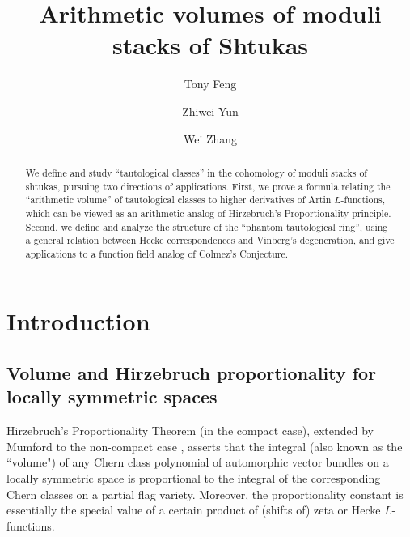 \documentclass[reqno]{amsart}
\title[Arithmetic volumes of moduli stacks of Shtukas]{Arithmetic volumes of moduli stacks of Shtukas}
\author{Tony Feng}
\author{Zhiwei Yun}
\author{Wei Zhang}
\date{}
\numberwithin{equation}{subsection}
\theoremstyle{definition}
\begin{document}
\begin{abstract}
    We define and study ``tautological classes'' in the cohomology of moduli stacks of shtukas, pursuing two directions of applications. First, we prove a formula relating the ``arithmetic volume'' of tautological classes to higher derivatives of Artin $L$-functions, which can be viewed as an arithmetic analog of Hirzebruch's Proportionality principle. Second, we define and analyze the structure of the ``phantom tautological ring'',  using a general relation between Hecke correspondences and Vinberg's degeneration, and give applications to a function field analog of Colmez's Conjecture. 
\end{abstract}

\maketitle


\tableofcontents

\section{Introduction}


\subsection{Volume and Hirzebruch proportionality for locally symmetric spaces}
Hirzebruch's Proportionality Theorem \cite{Hir} (in the compact case), extended by Mumford to the non-compact case \cite{Mum}, asserts that the integral (also known as the ``volume") of any Chern class polynomial of automorphic vector bundles on a locally symmetric space is proportional to the integral of the corresponding Chern classes on a partial flag variety. Moreover, the proportionality constant is essentially the special value of a certain product of (shifts of) zeta or Hecke $L$-functions. 
\end{document}
